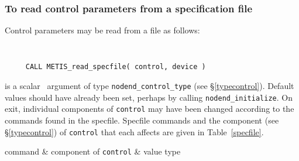 \documentclass{galahad}
\newcommand{\packagename}{nodend}
\begin{document}
\subsubsection{To read control parameters from a specification file}
\label{readspec}

Control parameters may be read from a file as follows:
\hskip0.5in

\def\baselinestretch{0.8}
{\tt
\begin{verbatim}
     CALL METIS_read_specfile( control, device )
\end{verbatim}
}
\def\baselinestretch{1.0}

\begin{description}
 is a scalar \intentinout\ argument of type
{\tt \packagename\_control\_type}
(see \S\ref{typecontrol}).
Default values should have already been set, perhaps by calling
{\tt \packagename\_initialize}.
On exit, individual components of {\tt control} may have been changed
according to the commands found in the specfile. Specfile commands and
the component (see \S\ref{typecontrol}) of {\tt control}
that each affects are given in Table~\ref{specfile}.

\hline
  command & component of {\tt control} & value type \\
\hline



\end{description}
\end{document}
